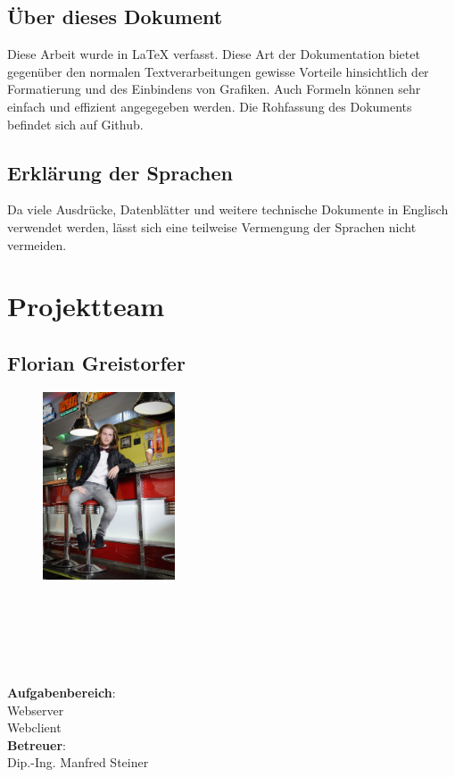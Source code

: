 \subsection*{Über dieses Dokument}
\label{sec:ueber-dokument}
Diese Arbeit wurde in \LaTeX{} verfasst. Diese Art der Dokumentation bietet gegenüber den normalen Textverarbeitungen gewisse Vorteile hinsichtlich der Formatierung und des Einbindens von Grafiken. Auch Formeln können sehr einfach und effizient angegegeben werden. Die Rohfassung des Dokuments befindet sich auf Github.

\subsection*{Erklärung der Sprachen}
\label{sec:sprachen-erklaerung}
Da viele Ausdrücke, Datenblätter und weitere technische Dokumente in Englisch verwendet werden, lässt sich eine teilweise Vermengung der Sprachen nicht vermeiden.


\clearpage

\newpage
\thispagestyle{empty}
\mbox{}

\clearpage

\section*{Projektteam}
\label{sec:projektteam}

\subsection*{Florian Greistorfer}
\begin{figure}
\begin{center}
  \includegraphics[width=0.35\textwidth]{Bilder/Fotos/Greistorfer}
\end{center}
\end{figure}
\mbox{}\\
\mbox{}\\
\mbox{}\\
\mbox{}\\
\mbox{}\\
\textbf{Aufgabenbereich}:\\
Webserver\\
Webclient\\
\textbf{Betreuer}:\\
Dip.-Ing. Manfred Steiner
\mbox{}\\
\mbox{}\\
\mbox{}\\
\mbox{}\\
\mbox{}\\

